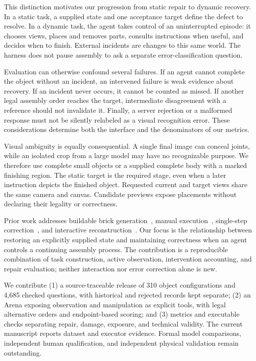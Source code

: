 \documentclass[10pt,twocolumn,letterpaper]{article}
\begin{document}
This distinction motivates our progression from static repair to dynamic recovery. In a static task, a supplied state and one acceptance target define the defect to resolve. In a dynamic task, the agent takes control of an uninterrupted episode: it chooses views, places and removes parts, consults instructions when useful, and decides when to finish. External incidents are changes to this same world. The harness does not pause assembly to ask a separate error-classification question.

Evaluation can otherwise confound several failures. If an agent cannot complete the object without an incident, an intervened failure is weak evidence about recovery. If an incident never occurs, it cannot be counted as missed. If another legal assembly order reaches the target, intermediate disagreement with a reference should not invalidate it. Finally, a server rejection or a malformed response must not be silently relabeled as a visual recognition error. These considerations determine both the interface and the denominators of our metrics.

Visual ambiguity is equally consequential. A single final image can conceal joints, while an isolated crop from a large model may have no recognizable purpose. We therefore use complete small objects or a supplied complete body with a marked finishing region. The static target is the required stage, even when a later instruction depicts the finished object. Requested current and target views share the same camera and canvas. Candidate previews expose placements without declaring their legality or correctness.

Prior work addresses buildable brick generation~\cite{pun2025brickgpt,kulits2026bricknet}, manual execution~\cite{wang2022mepnet}, single-step correction~\cite{wan2024scanet}, and interactive reconstruction~\cite{walsman2022breakmake}. Our focus is the relationship between restoring an explicitly supplied state and maintaining correctness when an agent controls a continuing assembly process. The contribution is a reproducible combination of task construction, active observation, intervention accounting, and repair evaluation; neither interaction nor error correction alone is new.

We contribute (1) a source-traceable release of 310 object configurations and 4,685 checked questions, with historical and rejected records kept separate; (2) an Arena exposing observation and manipulation as explicit tools, with legal alternative orders and endpoint-based scoring; and (3) metrics and executable checks separating repair, damage, exposure, and technical validity. The current manuscript reports dataset and executor evidence. Formal model comparisons, independent human qualification, and independent physical validation remain outstanding.
\end{document}
